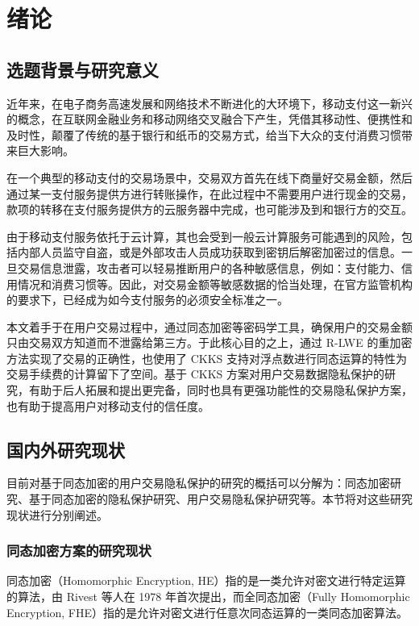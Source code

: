 \chapter{绪论}

\section{选题背景与研究意义}
近年来，在电子商务高速发展和网络技术不断进化的大环境下，移动支付这一新兴的概念，在互联网金融业务和移动网络交叉融合下产生，凭借其移动性、便携性和及时性，颠覆了传统的基于银行和纸币的交易方式，给当下大众的支付消费习惯带来巨大影响。\cite{mobilepaymentrisk}

在一个典型的移动支付的交易场景中，交易双方首先在线下商量好交易金额，然后通过某一支付服务提供方进行转账操作，在此过程中不需要用户进行现金的交易，款项的转移在支付服务提供方的云服务器中完成，也可能涉及到和银行方的交互。

由于移动支付服务依托于云计算，其也会受到一般云计算服务可能遇到的风险，包括内部人员监守自盗，或是外部攻击人员成功获取到密钥后解密加密过的信息\cite{lastpass}。一旦交易信息泄露，攻击者可以轻易推断用户的各种敏感信息，例如：支付能力、信用情况和消费习惯等。因此，对交易金额等敏感数据的恰当处理，在官方监管机构的要求下，已经成为如今支付服务的必须安全标准之一。\cite{gov_pay}

本文着手于在用户交易过程中，通过同态加密等密码学工具，确保用户的交易金额只由交易双方知道而不泄露给第三方。于此核心目的之上，通过 R-LWE 的重加密方法\cite{Mouchet2020LattigoAM,lattigoRepo}实现了交易的正确性，也使用了 CKKS 支持对浮点数进行同态运算的特性为交易手续费的计算留下了空间。基于 CKKS 方案对用户交易数据隐私保护的研究，有助于后人拓展和提出更完备，同时也具有更强功能性的交易隐私保护方案，也有助于提高用户对移动支付的信任度。

\section{国内外研究现状}

目前对基于同态加密的用户交易隐私保护的研究的概括可以分解为：同态加密研究、基于同态加密的隐私保护研究、用户交易隐私保护研究等。本节将对这些研究现状进行分别阐述。

\subsection{同态加密方案的研究现状}

同态加密（Homomorphic Encryption, HE）指的是一类允许对密文进行特定运算的算法，由 Rivest 等人在 1978 年首次提出\cite{rivest1978data}，而全同态加密（Fully Homomorphic Encryption, FHE）指的是允许对密文进行任意次同态运算的一类同态加密算法。

